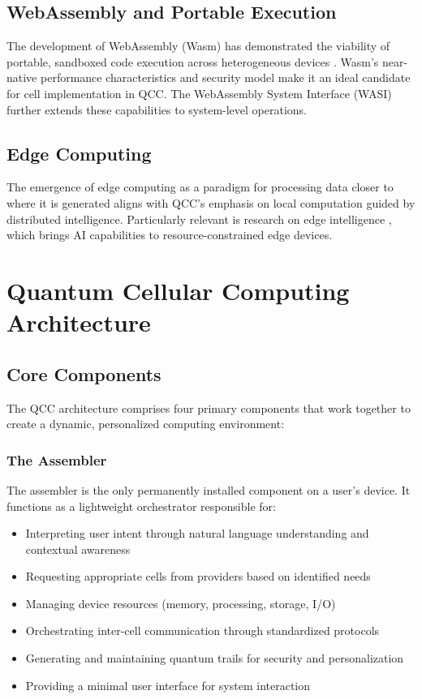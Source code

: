 \documentclass[11pt,a4paper]{article}
\begin{document}
\subsection{WebAssembly and Portable Execution}

The development of WebAssembly (Wasm) has demonstrated the viability of portable, sandboxed code execution across heterogeneous devices \cite{WASM}. Wasm's near-native performance characteristics and security model make it an ideal candidate for cell implementation in QCC. The WebAssembly System Interface (WASI) \cite{wasi} further extends these capabilities to system-level operations.

\subsection{Edge Computing}

The emergence of edge computing as a paradigm for processing data closer to where it is generated \cite{edge} aligns with QCC's emphasis on local computation guided by distributed intelligence. Particularly relevant is research on edge intelligence \cite{edgeAI}, which brings AI capabilities to resource-constrained edge devices.

\section{Quantum Cellular Computing Architecture}

\subsection{Core Components}

The QCC architecture comprises four primary components that work together to create a dynamic, personalized computing environment:

\subsubsection{The Assembler}

The assembler is the only permanently installed component on a user's device. It functions as a lightweight orchestrator responsible for:

\begin{itemize}
    \item Interpreting user intent through natural language understanding and contextual awareness
    \item Requesting appropriate cells from providers based on identified needs
    \item Managing device resources (memory, processing, storage, I/O)
    \item Orchestrating inter-cell communication through standardized protocols
    \item Generating and maintaining quantum trails for security and personalization
    \item Providing a minimal user interface for system interaction
\end{itemize}
\end{document}
